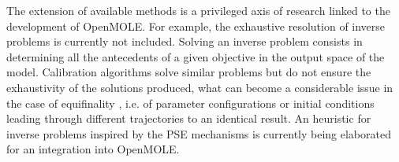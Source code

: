 \documentclass[10pt]{article}
\begin{document}
The extension of available methods is a privileged axis of research linked to the development of OpenMOLE. For example, the exhaustive resolution of inverse problems \citep{aster2018parameter} is currently not included. Solving an inverse problem consists in determining all the antecedents of a given objective in the output space of the model. Calibration algorithms solve similar problems but do not ensure the exhaustivity of the solutions produced, what can become a considerable issue in the case of equifinality \citep{}, i.e. of parameter configurations or initial conditions leading through different trajectories to an identical result. An heuristic for inverse problems inspired by the PSE mechanisms is currently being elaborated for an integration into OpenMOLE.
\end{document}
